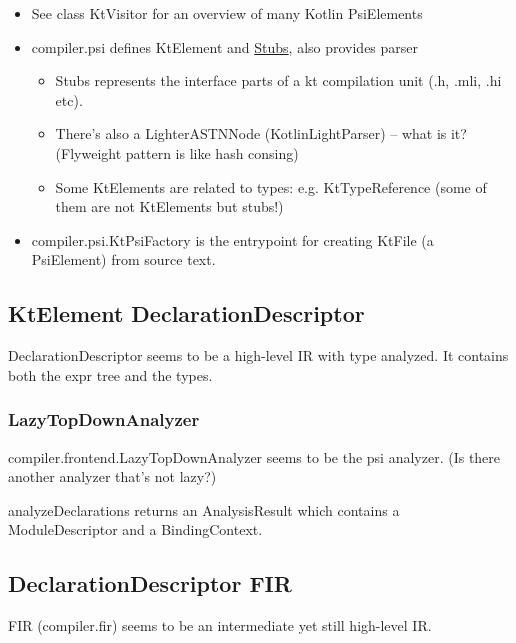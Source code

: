 \documentclass{article}
\begin{document}
\begin{itemize}
    \item See class KtVisitor for an overview of many Kotlin PsiElements
    \item compiler.psi defines KtElement and \href{https://www.jetbrains.org/intellij/sdk/docs/basics/indexing_and_psi_stubs/stub_indexes.html}{Stubs}, also provides parser
    \begin{itemize}
        \item Stubs represents the interface parts of a kt compilation unit
        (.h, .mli, .hi etc).
        \item There's also a LighterASTNNode (KotlinLightParser) -- what is it? (Flyweight pattern is like hash consing)
        \item Some KtElements are related to types: e.g. KtTypeReference (some of them are not KtElements but stubs!)
    \end{itemize}
    \item compiler.psi.KtPsiFactory is the entrypoint for creating KtFile (a PsiElement) from source text.
\end{itemize}

\subsection{KtElement \textSafeTo DeclarationDescriptor}

DeclarationDescriptor seems to be a high-level IR with type analyzed. It contains both the expr tree and the types.

\subsubsection{LazyTopDownAnalyzer}

compiler.frontend.LazyTopDownAnalyzer seems to be the psi analyzer. (Is there another analyzer that's not lazy?)

analyzeDeclarations returns an AnalysisResult which contains a ModuleDescriptor and a BindingContext.

\subsection{DeclarationDescriptor \textSafeTo FIR}

FIR (compiler.fir) seems to be an intermediate yet still high-level IR.
\end{document}
